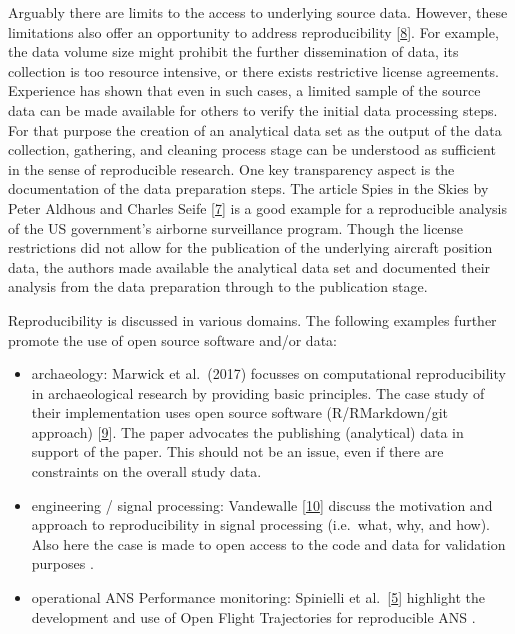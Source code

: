 \documentclass[conference,final,a4paper,]{IEEEtran}
\providecommand{\tightlist}{%
  \setlength{\itemsep}{0pt}\setlength{\parskip}{0pt}}
\begin{document}
Arguably there are limits to the access to underlying source data. However, these limitations also offer an opportunity to address reproducibility {[}\protect\hyperlink{ref-koelle_open_2017}{8}{]}. For example, the data volume size might prohibit the further dissemination of data, its collection is too resource intensive, or there exists restrictive license agreements. Experience has shown that even in such cases, a limited sample of the source data can be made available for others to verify the initial data processing steps.
For that purpose the creation of an analytical data set as the output of the data collection, gathering, and cleaning process stage can be understood as sufficient in the sense of reproducible research.
One key transparency aspect is the documentation of the data preparation steps.
The article Spies in the Skies by Peter Aldhous and Charles Seife {[}\protect\hyperlink{ref-peteraldhous_2016}{7}{]} is a good example for a reproducible analysis of the US government's airborne surveillance program. Though the license restrictions did not allow for the publication of the underlying aircraft position data, the authors made available the analytical data set and documented their analysis from the data preparation through to the publication stage.

Reproducibility is discussed in various domains. The following examples further promote the use of open source software and/or data:

\begin{itemize}
\tightlist
\item
  archaeology: Marwick et al.~(2017) focusses on computational reproducibility in archaeological research by providing basic principles. The case study of their implementation uses open source software (R/RMarkdown/git approach) {[}\protect\hyperlink{ref-marwick_2017}{9}{]}. The paper advocates the publishing (analytical) data in support of the paper. This should not be an issue, even if there are constraints on the overall study data.
\item
  engineering / signal processing: Vandewalle {[}\protect\hyperlink{ref-vandewalle_2009}{10}{]} discuss the motivation and approach to reproducibility in signal processing (i.e.~what, why, and how). Also here the case is made to open access to the code and data for validation purposes .
\item
  operational ANS Performance monitoring: Spinielli et al.~{[}\protect\hyperlink{ref-spinielli_2018}{5}{]} highlight the development and use of Open Flight Trajectories for reproducible ANS .
\end{itemize}
\end{document}
